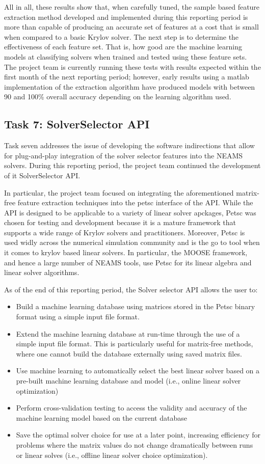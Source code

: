 All in all, these results show that, when carefully tuned, the sample based feature extraction method developed and implemented during this reporting period is more than capable of producing an accurate set of features at a cost that is small when compared to a basic Krylov solver. The next step is to determine the effectiveness of each feature set. That is, how good are the machine learning models at classifying solvers when trained and tested using these feature sets. The project team is currently running these tests with results expected within the first month of the next reporting period; however, early results using a matlab implementation of the extraction algorithm have produced models with between 90 and 100\% overall accuracy depending on the learning algorithm used. 

\subsection{ Task 7: SolverSelector API }
\label{API}
Task seven addresses the issue of developing the software indirections that allow for plug-and-play integration of the solver selector features into the NEAMS solvers. During this reporting period, the project team continued the development of it SolverSelector API. 

In particular, the project team focused on integrating the aforementioned matrix-free feature extraction techniques into the petsc interface of the API. While the API is designed to be applicable to a variety of linear solver apckages, Petsc was chosen for testing and development because it is a mature framework that supports a wide range of Krylov solvers and practitioners. Moreover, Petsc is used widly across the numerical simulation community and is the go to tool when it comes to krylov based linear solvers. In particular, the MOOSE framework, and hence a large number of NEAMS tools, use Petsc for its linear algebra and linear solver algorithms. 

As of the end of this reporting period, the Solver selector API allows the user to:
\begin{itemize}
 \item Build a machine learning database using matrices stored in the Petsc binary format using a simple input file format. 
 \item Extend the machine learning database at run-time through the use of a simple input file format. This is particularly useful for matrix-free methods, where one cannot build the database externally using saved matrix files. 
 \item Use machine learning to automatically select the best linear solver based on a pre-built machine learning database and model (i.e., online linear solver optimization)
 \item Perform cross-validation testing to access the validity and accuracy of the machine learning model based on the current database
 \item Save the optimal solver choice for use at a later point, increasing efficiency for problems where the matrix values do not change dramatically between runs or linear solves (i.e., offline linear solver choice optimization).
\end{itemize}

